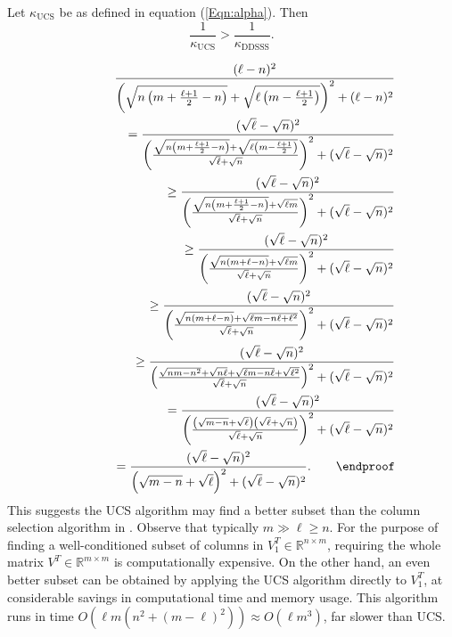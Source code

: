 \documentclass[final,leqno,onefignum,onetabnum]{siamltex1213}
\begin{document}
\begin{corollary}
Let $\kappa_{\text{UCS}}$ be as defined in equation (\ref{Eqn:alpha}).  Then
$$\frac{1}{\kappa_{\text{UCS}}}>\frac{1}{\kappa_{\text{DDSSS}}}.$$
\end{corollary}
\proof
\footnotesize
\begin{eqnarray}
&&\frac{(\ell-n)^2}{\left(\sqrt{n\left(m+\frac{\ell+1}{2}-n\right)}+\sqrt{\ell\left(m-\frac{\ell+1}{2}\right)}\right)^2+(\ell-n)^2}\nonumber\\
&&\hspace{1cm}=\frac{(\sqrt{\ell}-\sqrt{n})^2}{\left(\frac{\sqrt{n\left(m+\frac{\ell+1}{2}-n\right)}+\sqrt{\ell\left(m-\frac{\ell+1}{2}\right)}}{\sqrt{\ell}+\sqrt{n}}\right)^2+(\sqrt{\ell}-\sqrt{n})^2}\nonumber\\
&&\hspace{1cm}\ge\frac{(\sqrt{\ell}-\sqrt{n})^2}{\left(\frac{\sqrt{n\left(m+\frac{\ell+1}{2}-n\right)}+\sqrt{\ell m}}{\sqrt{\ell}+\sqrt{n}}\right)^2+(\sqrt{\ell}-\sqrt{n})^2}\nonumber\\
&&\hspace{1cm}\ge\frac{(\sqrt{\ell}-\sqrt{n})^2}{\left(\frac{\sqrt{n\left(m+\ell-n\right)}+\sqrt{\ell m}}{\sqrt{\ell}+\sqrt{n}}\right)^2+(\sqrt{\ell}-\sqrt{n})^2}\nonumber\\
&&\hspace{1cm}\ge\frac{(\sqrt{\ell}-\sqrt{n})^2}{\left(\frac{\sqrt{n\left(m+\ell-n\right)}+\sqrt{\ell m-n\ell+\ell^2}}{\sqrt{\ell}+\sqrt{n}}\right)^2+(\sqrt{\ell}-\sqrt{n})^2}\nonumber\\
&&\hspace{1cm}\ge\frac{(\sqrt{\ell}-\sqrt{n})^2}{\left(\frac{\sqrt{nm-n^2}+\sqrt{n\ell}+\sqrt{\ell m-n\ell}+\sqrt{\ell^2}}{\sqrt{\ell}+\sqrt{n}}\right)^2+(\sqrt{\ell}-\sqrt{n})^2}\nonumber\\
&&\hspace{1cm}=\frac{(\sqrt{\ell}-\sqrt{n})^2}{\left(\frac{\left(\sqrt{m-n}+\sqrt{\ell}\right)\left(\sqrt{\ell}+\sqrt{n}\right)}{\sqrt{\ell}+\sqrt{n}}\right)^2+(\sqrt{\ell}-\sqrt{n})^2}\nonumber\\
&&\hspace{1cm}=\frac{(\sqrt{\ell}-\sqrt{n})^2}{\left(\sqrt{m-n}+\sqrt{\ell}\right)^2+(\sqrt{\ell}-\sqrt{n})^2}.\hspace{2 em}\endproof\nonumber
\end{eqnarray}
\normalsize
This suggests the UCS algorithm may find a better subset than the column selection algorithm in \cite{nearoptcol}. Observe that typically $m \gg \ell \geq n$. For the purpose of finding a well-conditioned subset of columns in $V_1^T\in\mathbb{R}^{n\times m}$, requiring the whole matrix $V^T\in\mathbb{R}^{m\times m}$ is computationally expensive. On the other hand, an even better subset can be obtained by applying the UCS algorithm directly to $V_1^T$, at considerable savings in computational time and memory usage.  This algorithm runs in time $O\left(\ell m\left(n^2+\left(m-\ell\right)^2\right)\right)\approx O\left(\ell m^3\right)$, far slower than UCS.
\end{document}
